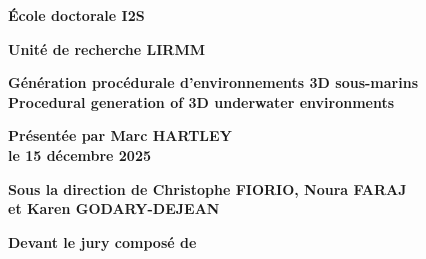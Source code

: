 \begin{titlepage}
{		\bigskip
		\textbf{École doctorale I2S}
		
		\bigskip
		\textbf{Unité de recherche LIRMM}
		
		
		\color{Titleblue}
		\fontsize{17}{20.4}\selectfont
		\vspace{2cm}
		\textbf{Génération procédurale d'environnements 3D sous-marins\\Procedural generation of 3D underwater environments}
		
		
		\vspace{4cm}
		\fontsize{15}{18}\selectfont
		\color{black}
		\textbf{Présentée par Marc HARTLEY \\
			le 15 décembre 2025}
		
		\bigskip
		\fontsize{13}{15.6}\selectfont
		\textbf{Sous la direction de Christophe FIORIO, 
			Noura FARAJ \\
			et Karen GODARY-DEJEAN}
		
		\vspace{1.5cm}
		\normalsize
		\textbf{Devant le jury composé de}\\
		\bigskip
		\fontsize{10}{12}\selectfont
		\vspace{1.5mm}
		\begin{tabularx}{\textwidth}{l X r}


\end{tabularx}}
\end{titlepage}
